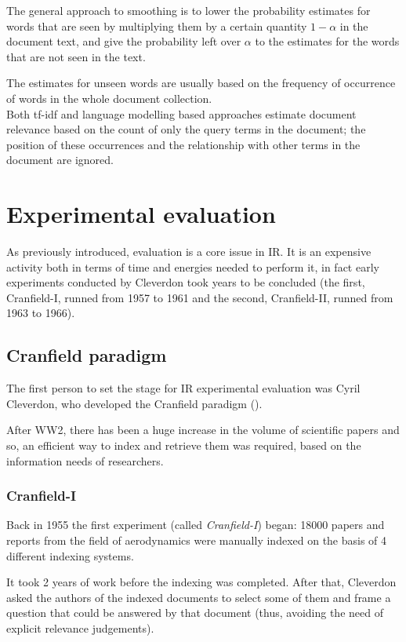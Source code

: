 The general approach to smoothing is to lower the probability estimates for words that are seen by multiplying them by a certain quantity $1- \alpha$ in the document text, and give the probability left over $\alpha$ to the estimates for the words that are not seen in the text.

The estimates for unseen words are usually based on the frequency of occurrence of words in the whole document collection. \\

Both tf-idf and language modelling based approaches estimate document relevance based on the count of only the query terms in the document; the position of these occurrences and the relationship with other terms in the document are ignored.

\section{Experimental evaluation}

As previously introduced, evaluation is a core issue in IR. It is an expensive activity both in terms of time and energies needed to perform it, in fact early experiments conducted by Cleverdon took years to be concluded (the first, Cranfield-I, runned from 1957 to 1961 and the second, Cranfield-II, runned from 1963 to 1966).

\subsection{Cranfield paradigm}

The first person to set the stage for IR experimental evaluation was Cyril Cleverdon, who developed the Cranfield paradigm (\cite{harmaneval}).

After WW2, there has been a huge increase in the volume of scientific papers and so, an efficient way to index and retrieve them was required, based on the information needs of researchers.

\subsubsection{Cranfield-I}

Back in 1955 the first experiment (called \textit{Cranfield-I}) began: 18000 papers and reports from the field of aerodynamics were manually indexed on the basis of 4 different indexing systems.

It took 2 years of work before the indexing was completed. After that, Cleverdon asked the authors of the indexed documents to select some of them and frame a question that could be answered by that document (thus, avoiding the need of explicit relevance judgements).

